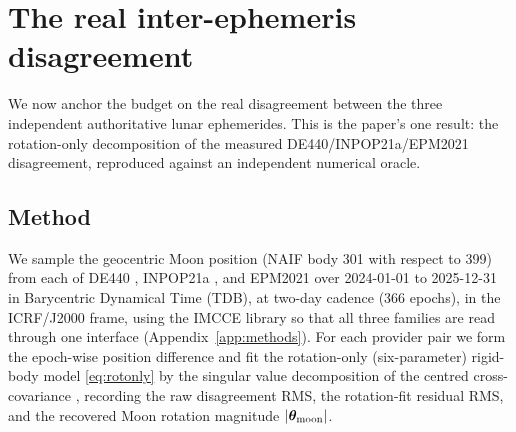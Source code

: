\section{The real inter-ephemeris disagreement}
\label{sec:interephemeris}

We now anchor the budget on the real disagreement between the three independent
authoritative lunar ephemerides. This is the paper's one \Validated{} result: the
rotation-only decomposition of the measured DE440/INPOP21a/EPM2021 disagreement,
reproduced against an independent numerical oracle.

\subsection{Method}
\label{sec:interephmethod}

We sample the geocentric Moon position (NAIF body 301 with respect to 399) from each
of DE440 \citep{park2021de440}, INPOP21a \citep{fienga2021inpop21a}, and EPM2021
\citep{pitjeva2021epm2021} over 2024-01-01 to 2025-12-31 in Barycentric Dynamical
Time (TDB), at two-day cadence ($366$ epochs), in the ICRF/J2000 frame, using the
IMCCE  library so that all three families are read through one
interface (Appendix~\ref{app:methods}). For each provider pair we form the epoch-wise
position difference and fit the rotation-only (six-parameter) rigid-body model
\eqref{eq:rotonly} by the singular value decomposition of the centred cross-covariance
\citep{arun1987leastsquares}, recording the raw disagreement RMS, the rotation-fit
residual RMS, and the recovered Moon rotation magnitude $|\bm{\theta}_{\mathrm{moon}}|$.

